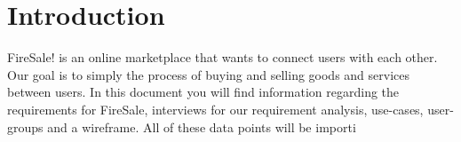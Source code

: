 \section{Introduction}
FireSale! is an online marketplace that wants to connect users with each other. Our goal is to simply the process of buying and selling goods and services between users. 
In this document you will find information regarding the requirements for FireSale, interviews for our requirement analysis, use-cases, user-groups and a wireframe. 
All of these data points will be importi